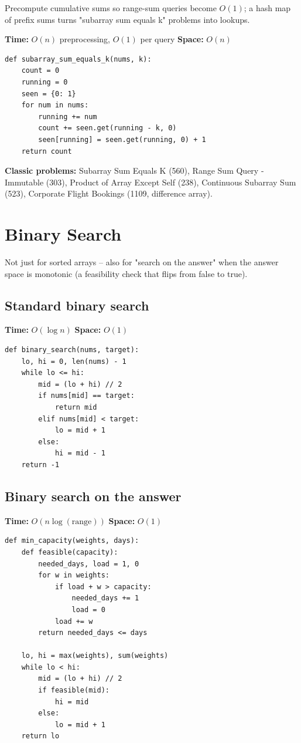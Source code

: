 \documentclass[11pt]{article}
\newcommand{\complexity}[2]{\textbf{Time:} #1 \quad \textbf{Space:} #2}
\begin{document}
Precompute cumulative sums so range-sum queries become $O(1)$; a hash map
of prefix sums turns "subarray sum equals k" problems into lookups.

\complexity{$O(n)$ preprocessing, $O(1)$ per query}{$O(n)$}

\begin{lstlisting}
def subarray_sum_equals_k(nums, k):
    count = 0
    running = 0
    seen = {0: 1}
    for num in nums:
        running += num
        count += seen.get(running - k, 0)
        seen[running] = seen.get(running, 0) + 1
    return count
\end{lstlisting}

\textbf{Classic problems:} Subarray Sum Equals K (560), Range Sum Query -
Immutable (303), Product of Array Except Self (238), Continuous Subarray
Sum (523), Corporate Flight Bookings (1109, difference array).

\section{Binary Search}

Not just for sorted arrays -- also for "search on the answer" when the
answer space is monotonic (a feasibility check that flips from false to
true).

\subsection{Standard binary search}
\complexity{$O(\log n)$}{$O(1)$}

\begin{lstlisting}
def binary_search(nums, target):
    lo, hi = 0, len(nums) - 1
    while lo <= hi:
        mid = (lo + hi) // 2
        if nums[mid] == target:
            return mid
        elif nums[mid] < target:
            lo = mid + 1
        else:
            hi = mid - 1
    return -1
\end{lstlisting}

\subsection{Binary search on the answer}
\complexity{$O(n \log(\text{range}))$}{$O(1)$}

\begin{lstlisting}
def min_capacity(weights, days):
    def feasible(capacity):
        needed_days, load = 1, 0
        for w in weights:
            if load + w > capacity:
                needed_days += 1
                load = 0
            load += w
        return needed_days <= days

    lo, hi = max(weights), sum(weights)
    while lo < hi:
        mid = (lo + hi) // 2
        if feasible(mid):
            hi = mid
        else:
            lo = mid + 1
    return lo
\end{lstlisting}
\end{document}
